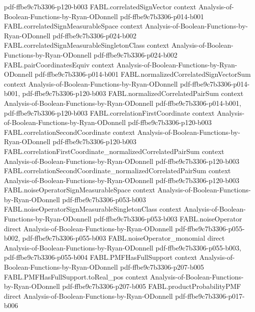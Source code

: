 \begin{theorem}
{    pdf-ffbe9c7b3306-p120-b003}
\proofstep
  {FABL.correlatedSignVector}
  {context}
  {Analysis-of-Boolean-Functions-by-Ryan-ODonnell}
  {pdf-ffbe9c7b3306-p014-b001}
\proofstep
  {FABL.correlatedSignMeasurableSpace}
  {context}
  {Analysis-of-Boolean-Functions-by-Ryan-ODonnell}
  {pdf-ffbe9c7b3306-p024-b002}
\proofstep
  {FABL.correlatedSignMeasurableSingletonClass}
  {context}
  {Analysis-of-Boolean-Functions-by-Ryan-ODonnell}
  {pdf-ffbe9c7b3306-p024-b002}
\proofstep
  {FABL.pairCoordinatesEquiv}
  {context}
  {Analysis-of-Boolean-Functions-by-Ryan-ODonnell}
  {pdf-ffbe9c7b3306-p014-b001}
\proofstep
  {FABL.normalizedCorrelatedSignVectorSum}
  {context}
  {Analysis-of-Boolean-Functions-by-Ryan-ODonnell}
  {pdf-ffbe9c7b3306-p014-b001,
    pdf-ffbe9c7b3306-p120-b003}
\proofstep
  {FABL.normalizedCorrelatedPairSum}
  {context}
  {Analysis-of-Boolean-Functions-by-Ryan-ODonnell}
  {pdf-ffbe9c7b3306-p014-b001,
    pdf-ffbe9c7b3306-p120-b003}
\proofstep
  {FABL.correlationFirstCoordinate}
  {context}
  {Analysis-of-Boolean-Functions-by-Ryan-ODonnell}
  {pdf-ffbe9c7b3306-p120-b003}
\proofstep
  {FABL.correlationSecondCoordinate}
  {context}
  {Analysis-of-Boolean-Functions-by-Ryan-ODonnell}
  {pdf-ffbe9c7b3306-p120-b003}
\proofstep
  {FABL.correlationFirstCoordinate_normalizedCorrelatedPairSum}
  {context}
  {Analysis-of-Boolean-Functions-by-Ryan-ODonnell}
  {pdf-ffbe9c7b3306-p120-b003}
\proofstep
  {FABL.correlationSecondCoordinate_normalizedCorrelatedPairSum}
  {context}
  {Analysis-of-Boolean-Functions-by-Ryan-ODonnell}
  {pdf-ffbe9c7b3306-p120-b003}
\proofstep
  {FABL.noiseOperatorSignMeasurableSpace}
  {context}
  {Analysis-of-Boolean-Functions-by-Ryan-ODonnell}
  {pdf-ffbe9c7b3306-p053-b003}
\proofstep
  {FABL.noiseOperatorSignMeasurableSingletonClass}
  {context}
  {Analysis-of-Boolean-Functions-by-Ryan-ODonnell}
  {pdf-ffbe9c7b3306-p053-b003}
\proofstep
  {FABL.noiseOperator}
  {direct}
  {Analysis-of-Boolean-Functions-by-Ryan-ODonnell}
  {pdf-ffbe9c7b3306-p055-b002,
    pdf-ffbe9c7b3306-p055-b003}
\proofstep
  {FABL.noiseOperator_monomial}
  {direct}
  {Analysis-of-Boolean-Functions-by-Ryan-ODonnell}
  {pdf-ffbe9c7b3306-p055-b003,
    pdf-ffbe9c7b3306-p055-b004}
\proofstep
  {FABL.PMFHasFullSupport}
  {context}
  {Analysis-of-Boolean-Functions-by-Ryan-ODonnell}
  {pdf-ffbe9c7b3306-p207-b005}
\proofstep
  {FABL.PMFHasFullSupport.toReal_pos}
  {context}
  {Analysis-of-Boolean-Functions-by-Ryan-ODonnell}
  {pdf-ffbe9c7b3306-p207-b005}
\proofstep
  {FABL.productProbabilityPMF}
  {direct}
  {Analysis-of-Boolean-Functions-by-Ryan-ODonnell}
  {pdf-ffbe9c7b3306-p017-b006}

\end{theorem}
